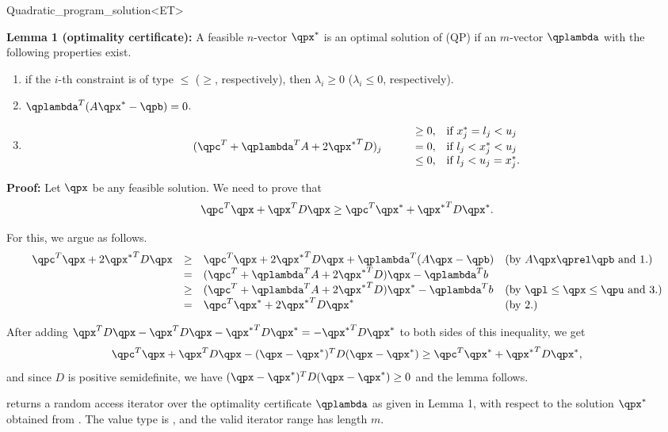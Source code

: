 \begin{ccRefClass}{Quadratic_program_solution<ET>}
\begin{ccAdvanced}
{\bf Lemma 1 (optimality certificate):} A feasible $n$-vector $\qpx^*$ 
is an optimal solution of (QP) if an $m$-vector $\qplambda$ with the
following properties exist.
\begin{enumerate}
\item if the $i$-th constraint is of type $\leq$ ($\geq$, respectively), 
then $\lambda_i\geq 0$ ($\lambda_i\leq 0$, respectively).
\item $\qplambda^T(A\qpx^*-\qpb) = 0$.
\item \[
\begin{array}{llll}
&&\geq 0, & \mbox{if $x^*_j = l_j < u_j$} \\
(\qpc^T + \qplambda^T A + 2{\qpx^*}^TD)_j& \quad  &= 0, & \mbox{if $l_j < x^*_j < u_j$} \\
&&\leq 0, & \mbox{if $l_j < u_j = x^*_j$.}
\end{array}\]
\end{enumerate}

{\bf Proof:} Let $\qpx$ be any feasible solution. We need to prove that
\[\qpc^T\qpx + \qpx^TD\qpx \geq \qpc^T\qpx^* + {\qpx^*}^TD\qpx^*.\]

For this, we argue as follows.
\[
\begin{array}{lcll}
\qpc^T\qpx + 2{\qpx^*}^TD\qpx &\geq& \qpc^T\qpx + 2{\qpx^*}^TD\qpx + \qplambda^T(A\qpx-\qpb) &  
\mbox{(by $A\qpx\qprel \qpb$ and 1.)} \\
                  &=& (\qpc^T + \qplambda^T A + 2{\qpx^*}^TD)\qpx - \qplambda^Tb \\
                  &\geq& (\qpc^T + \qplambda^T A + 2{\qpx^*}^TD)\qpx^* - \qplambda^Tb &
\mbox{(by $\qpl\leq \qpx \leq \qpu$ and 3.)} \\
                  &=& \qpc^T\qpx^* + 2{\qpx^*}^TD\qpx^* &
\mbox{(by 2.)}
\end{array}
\]

After adding $\qpx^TD\qpx - \qpx^TD\qpx - {\qpx^*}^TD\qpx^* = -{\qpx^*}^TD\qpx^*$ to both sides of
this inequality, we get
\[
\qpc^T\qpx + \qpx^TD\qpx - (\qpx-\qpx^*)^TD(\qpx-\qpx^*) \geq \qpc^T\qpx^* + {\qpx^*}^TD\qpx^*,
\] 
and since $D$ is positive semidefinite, we have
$(\qpx-\qpx^*)^TD(\qpx-\qpx^*)\geq 0$ and the lemma follows.


{returns a random access iterator over the optimality certificate 
$\qplambda$ as given in Lemma 1, with respect to the solution $\qpx^*$ 
obtained from \ccVar{}. The value type
is , and the valid iterator range has length $m$.
\ccPrecond \ccVar{}}


\end{ccAdvanced}
\end{ccRefClass}

